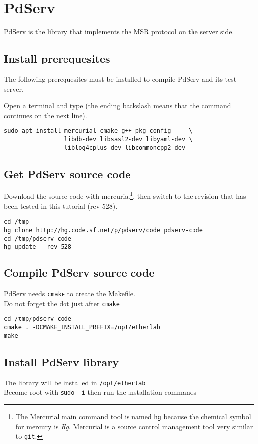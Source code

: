 \chapter{PdServ}


PdServ is the library that implements the MSR protocol on the server side.

\section{Install prerequesites}

The following prerequesites must be installed to compile PdServ and its test
server.

\noindent Open a terminal and type (the ending backslash means that
the command continues on the next line).
\begin{verbatim}
sudo apt install mercurial cmake g++ pkg-config     \
                 libdb-dev libsasl2-dev libyaml-dev \
                 liblog4cplus-dev libcommoncpp2-dev
\end{verbatim}


\section{Get PdServ source code}
Download the source code with mercurial\footnote{The Mercurial main
  command tool is named \texttt{hg} because the chemical symbol for
  mercury is \emph{Hg}. Mercurial is a source control management tool
  very similar to \texttt{git}.}, then switch to the revision that has
been tested in this tutorial (rev 528).

\begin{verbatim}
cd /tmp
hg clone http://hg.code.sf.net/p/pdserv/code pdserv-code
cd /tmp/pdserv-code
hg update --rev 528
\end{verbatim}

\section{Compile PdServ source code}

PdServ needs \texttt{cmake} to create the Makefile.\\
Do not forget the dot just after \texttt{cmake}
\begin{verbatim}
cd /tmp/pdserv-code
cmake . -DCMAKE_INSTALL_PREFIX=/opt/etherlab
make
\end{verbatim}


\section{Install PdServ library}
The library will be installed in \texttt{/opt/etherlab} \\
Become root with \texttt{sudo -i} then run the installation commands

